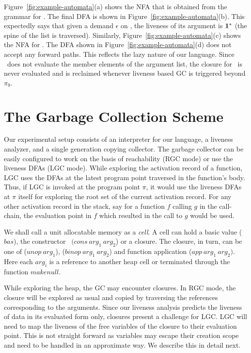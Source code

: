 \documentclass[9pt]{sigplanconf}
\begin{document}
Figure~\ref{fig:example-automata}(a)  shows the  NFA that  is obtained
from the grammar for .  The final DFA is shown in
Figure~\ref{fig:example-automata}(b).  This expectedly says that given
a  demand $\epsilon$  on  \length,  the liveness  of  its argument  is
$\mathbf{1}^{*}$  (the  spine  of   the  list  is  traversed).   Similarly,
Figure~\ref{fig:example-automata}(c)     shows     the     NFA     for
.          The         DFA         shown         in
Figure~\ref{fig:example-automata}(d)  does  not   accept  any  forward
paths.   This  reflects  the  lazy  nature  of  our  language.   Since
\length\ does not  evaluate the member elements of  the argument list,
the  closure for  \pa\ is  never evaluated  and is  reclaimed whenever
liveness based GC is triggered beyond $\pi_9$.


\section{The Garbage Collection Scheme}
\label{sec:GC-scheme}
Our experimental setup consists of  an interpreter for our language, a
liveness  analyzer, and  a single  generation copying  collector.  The
garbage collector  can be  easily configured to  work on the  basis of
reachability (RGC  mode) or use  the liveness DFAs (LGC  mode).  While
exploring the  activation record of a  function, LGC uses  the DFAs at
the latest program  point traversed in the function's  body.  Thus, if
LGC is invoked  at the program point $\pi$, it  would use the liveness
DFAs  at  $\pi$ itself  for  exploring the  root  set  of the  current
activation record. For  any other activation record in  the stack, say
for a function ${\mathit f}$  calling ${\mathit g}$ in the call-chain,
the evaluation  point in ${\mathit f}$  which resulted in  the call to
${\mathit g}$ would be used.

We shall call  a unit allocatable memory as a {\em  cell}.  A cell can
hold  a  basic  value   ($\mathit{bas}$),  the  constructor  \CONS\  $(\mathit{cons~
arg_1~arg_2}$) or   a closure.  The closure, in  turn, can be  one of
($\mathit{unop~arg_1}$),  ($\mathit{ binop~arg_1~arg_2}$)  and  function  application
($\mathit{app~arg_1~arg_2})$.  Here each $\mathit{ arg_i}$ is a reference to another heap
cell or terminated through the function $\mathit{makenull}$.

While exploring the heap, the GC  may encounter closures. In RGC mode,
the closure  will be explored  as usual  and copied by  traversing the
references corresponding to the arguments. Since our liveness analysis
predicts the  liveness of  data in its  evaluated form  only, closures
present a challenge for LGC. LGC will  need to map the liveness of the
free variables of the closure to  their evaluation point.  This is not
straight  forward as  variables may  escape their  creation scope  and
need to  be handled in an  approximate way.  We describe this in detail next.
\end{document}
